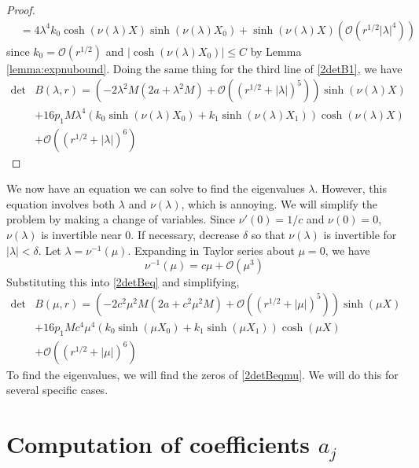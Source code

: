 \documentclass[thesis.tex]{subfiles}
\begin{document}
\begin{lemma}
\begin{proof}
\begin{align*}
&= 4 \lambda^4 k_0 \cosh(\nu(\lambda)X)\sinh(\nu(\lambda)X_0) + \sinh(\nu(\lambda)X)(\mathcal{O}(r^{1/2}|\lambda|^4))
\end{align*}
since $k_0 = \mathcal{O}(r^{1/2})$ and $|\cosh(\nu(\lambda)X_0)|\leq C$ by Lemma \ref{lemma:expnubound}. Doing the same thing for the third line of \cref{2detB1}, we have
\begin{equation*}
\begin{aligned}
\det &B(\lambda, r) = \left(-2 \lambda^2 M (2a + \lambda^2 M) +  \mathcal{O}( (r^{1/2} + |\lambda|)^5 )\right) \sinh(\nu(\lambda)X) \\
&+16 p_1 M \lambda^4 ( k_0\sinh(\nu(\lambda)X_0) + k_1 \sinh(\nu(\lambda)X_1) ) \cosh(\nu(\lambda)X)  \\
&+ \mathcal{O}( (r^{1/2} + |\lambda|)^6) 
\end{aligned}
\end{equation*}
\end{proof}
\end{lemma}

We now have an equation we can solve to find the eigenvalues $\lambda$. However, this equation involves both $\lambda$ and $\nu(\lambda)$, which is annoying. We will simplify the problem by making a change of variables. Since $\nu'(0) = 1/c$ and $\nu(0) = 0$, $\nu(\lambda)$ is invertible near 0. If necessary, decrease $\delta$ so that $\nu(\lambda)$ is invertible for $|\lambda| < \delta$. Let $\lambda = \nu^{-1}(\mu)$. Expanding in Taylor series about $\mu = 0$, we have
\[
\nu^{-1}(\mu) = c \mu + \mathcal{O}(\mu^3)
\]
Substituting this into \cref{2detBeq} and simplifying, 
\begin{equation}\label{2detBeqmu}
\begin{aligned}
\det &B(\mu, r) = \left(-2 c^2 \mu^2 M (2a + c^2 \mu^2 M) +  \mathcal{O}( (r^{1/2} + |\mu|)^5 )\right) \sinh(\mu X) \\
&+16 p_1 M c^4 \mu^4 ( k_0\sinh(\mu X_0) + k_1 \sinh(\mu X_1) ) \cosh(\mu X)  \\
&+ \mathcal{O}( (r^{1/2} + |\mu|)^6) 
\end{aligned}
\end{equation}
To find the eigenvalues, we will find the zeros of \cref{2detBeqmu}. We will do this for several specific cases.

\section{Computation of coefficients $a_j$}
\end{document}
